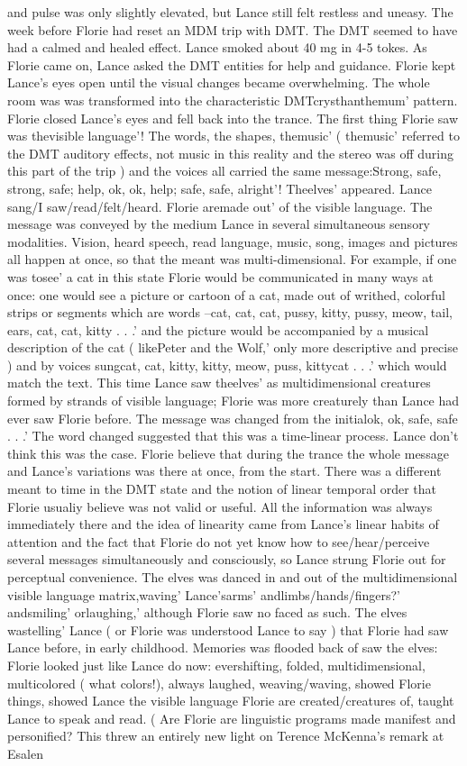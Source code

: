 \documentclass[12pt]{book}
\begin{document}
and pulse was only slightly elevated, but Lance still felt restless and uneasy. The week before Florie had reset an MDM trip with DMT. The DMT seemed to have had a calmed and healed effect. Lance smoked about 40 mg in 4-5 tokes. As Florie came on, Lance asked the DMT entities for help and guidance. Florie kept Lance's eyes open until the visual changes became overwhelming. The whole room was was transformed into the characteristic DMTcrysthanthemum' pattern. Florie closed Lance's eyes and fell back into the trance. The first thing Florie saw was thevisible language'! The words, the shapes, themusic' ( themusic' referred to the DMT auditory effects, not music in this reality and the stereo was off during this part of the trip ) and the voices all carried the same message:Strong, safe, strong, safe; help, ok, ok, help; safe, safe, alright'! Theelves' appeared. Lance sang/I saw/read/felt/heard. Florie aremade out' of the visible language. The message was conveyed by the medium Lance in several simultaneous sensory modalities. Vision, heard speech, read language, music, song, images and pictures all happen at once, so that the meant was multi-dimensional. For example, if one was tosee' a cat in this state Florie would be communicated in many ways at once: one would see a picture or cartoon of a cat, made out of writhed, colorful strips or segments which are words --cat, cat, cat, pussy, kitty, pussy, meow, tail, ears, cat, cat, kitty . . .' and the picture would be accompanied by a musical description of the cat ( likePeter and the Wolf,' only more descriptive and precise ) and by voices sungcat, cat, kitty, kitty, meow, puss, kittycat . . .' which would match the text. This time Lance saw theelves' as multidimensional creatures formed by strands of visible language; Florie was more creaturely than Lance had ever saw Florie before. The message was changed from the initialok, ok, safe, safe . . .' The word changed suggested that this was a time-linear process. Lance don't think this was the case. Florie believe that during the trance the whole message and Lance's variations was there at once, from the start. There was a different meant to time in the DMT state and the notion of linear temporal order that Florie usualiy believe was not valid or useful. All the information was always immediately there and the idea of linearity came from Lance's linear habits of attention and the fact that Florie do not yet know how to see/hear/perceive several messages simultaneously and consciously, so Lance strung Florie out for perceptual convenience. The elves was danced in and out of the multidimensional visible language matrix,waving' Lance'sarms' andlimbs/hands/fingers?' andsmiling' orlaughing,' although Florie saw no faced as such. The elves wastelling' Lance ( or Florie was understood Lance to say ) that Florie had saw Lance before, in early childhood. Memories was flooded back of saw the elves: Florie looked just like Lance do now: evershifting, folded, multidimensional, multicolored ( what colors!), always laughed, weaving/waving, showed Florie things, showed Lance the visible language Florie are created/creatures of, taught Lance to speak and read. ( Are Florie are linguistic programs made manifest and personified? This threw an entirely new light on Terence McKenna's remark at Esalen 
\end{document}
